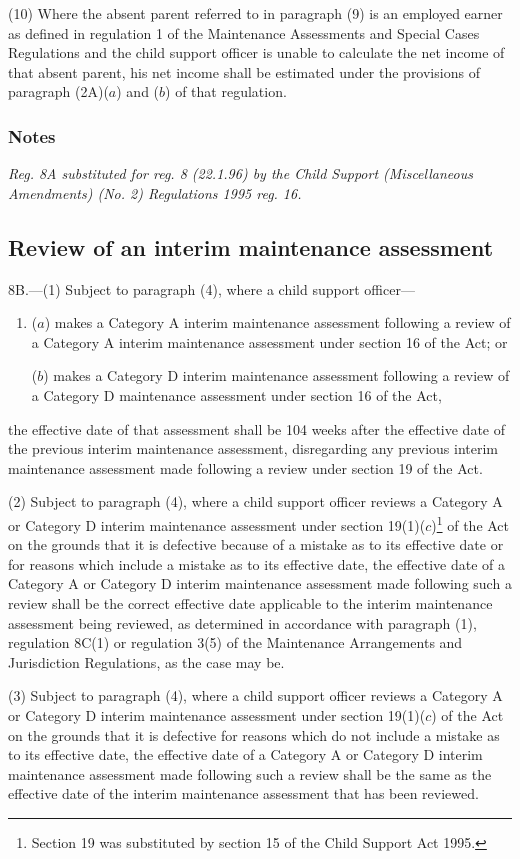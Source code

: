 \documentclass[a4paper]{article}
\newcommand\amendment[1]{\subsubsection*{Notes}{\itshape\frenchspacing\footnotesize #1 \par}}
\begin{document}
(10) Where the absent parent referred to in paragraph (9) is an employed earner as defined in regulation 1 of the Maintenance Assessments and Special Cases Regulations and the child support officer is unable to calculate the net income of that absent parent, his net income shall be estimated under the provisions of paragraph (2A)($a$) and ($b$) of that regulation.

\amendment{
Reg. 8A substituted for reg. 8 (22.1.96) by the Child Support (Miscellaneous Amendments) (No. 2) Regulations 1995 reg. 16.
}

\subsection[8B. Review of an interim maintenance assessment]{Review of an interim maintenance assessment}

8B.—(1) Subject to paragraph (4), where a child support officer—
\begin{enumerate}\item[]
($a$) makes a Category A interim maintenance assessment following a review of a Category A interim maintenance assessment under section 16 of the Act; or

($b$) makes a Category D interim maintenance assessment following a review of a Category D maintenance assessment under section 16 of the Act,
\end{enumerate}
the effective date of that assessment shall be 104 weeks after the effective date of the previous interim maintenance assessment, disregarding any previous interim maintenance assessment made following a review under section 19 of the Act.

(2) Subject to paragraph (4), where a child support officer reviews a Category A or Category D interim maintenance assessment under section 19(1)($c$)\footnote{\frenchspacing Section 19 was substituted by section 15 of the Child Support Act 1995.} of the Act on the grounds that it is defective because of a mistake as to its effective date or for reasons which include a mistake as to its effective date, the effective date of a Category A or Category D interim maintenance assessment made following such a review shall be the correct effective date applicable to the interim maintenance assessment being reviewed, as determined in accordance with paragraph (1), regulation 8C(1) or regulation 3(5) of the Maintenance Arrangements and Jurisdiction Regulations, as the case may be.

(3) Subject to paragraph (4), where a child support officer reviews a Category A or Category D interim maintenance assessment under section 19(1)($c$) of the Act on the grounds that it is defective for reasons which do not include a mistake as to its effective date, the effective date of a Category A or Category D interim maintenance assessment made following such a review shall be the same as the effective date of the interim maintenance assessment that has been reviewed.
\end{document}
